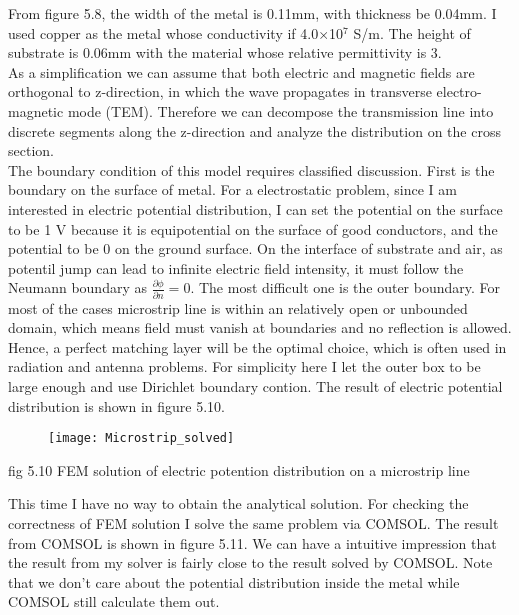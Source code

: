 \documentclass[journal]{IEEEtran}
\begin{document}
From figure 5.8, the width of the metal is 0.11mm, with thickness be 0.04mm. I used copper as the metal whose conductivity if 4.0$\times$10$^7$ S/m. The height of substrate is 0.06mm with the material whose relative permittivity is 3.\\

As a simplification we can assume that both electric and magnetic fields are orthogonal to z-direction, in which the wave propagates in transverse electro-magnetic mode (TEM). Therefore we can decompose the transmission line into discrete segments along the z-direction and analyze the distribution on the cross section. \\

The boundary condition of this model requires classified discussion. First is the boundary on the surface of metal. For a electrostatic problem, since I am interested in electric potential distribution, I can set the potential on the surface to be 1 V because it is equipotential on the surface of good conductors, and the potential to be 0 on the ground surface. On the interface of substrate and air, as potentil jump can lead to infinite electric field intensity, it must follow the Neumann boundary as $\frac{\partial \phi}{\partial n} = 0$. The most difficult one is the outer boundary. For most of the cases microstrip line is within an relatively open or unbounded domain, which means field must vanish at boundaries and no reflection is allowed. Hence, a perfect matching layer will be the optimal choice, which is often used in radiation and antenna problems. For simplicity here I let the outer box to be large enough and use Dirichlet boundary contion. The result of electric potential distribution is shown in figure 5.10.
\begin{figure}[h]
	\centering
	\texttt{[image: Microstrip\_solved]}
\end{figure}
\begin{center}
	\small fig 5.10 FEM solution of electric potention distribution on a microstrip line 
\end{center} 

This time I have no way to obtain the analytical solution. For checking the correctness of FEM solution I solve the same problem via COMSOL. The result from COMSOL is shown in figure 5.11. We can have a intuitive impression that the result from my solver is fairly close to the result solved by COMSOL. Note that we don't care about the potential distribution inside the metal while COMSOL still calculate them out.
\end{document}
